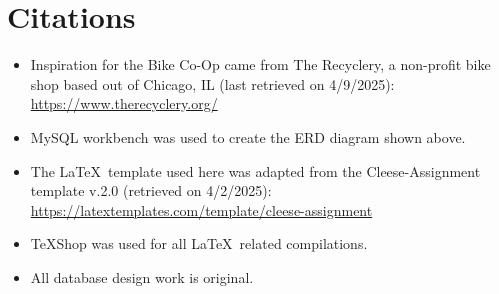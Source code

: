 \documentclass{article}
\begin{document}
\section{Citations}

\begin{tcolorbox}[colback=secondarycolor, colframe=primarycolor, arc=5mm]
\begin{itemize}
  \item Inspiration for the Bike Co-Op came from The Recyclery, a non-profit bike shop based out of Chicago, IL (last retrieved on 4/9/2025): \href{https://www.therecyclery.org/}{https://www.therecyclery.org/}
  
  \vspace{0.2cm}
  
  \item MySQL workbench was used to create the ERD diagram shown above.
  
  \vspace{0.2cm}
  
  \item The \LaTeX\ template used here was adapted from the Cleese-Assignment template v.2.0 (retrieved on 4/2/2025): \href{https://latextemplates.com/template/cleese-assignment}{https://latextemplates.com/template/cleese-assignment}
  
  \vspace{0.2cm}
  
  \item TeXShop was used for all \LaTeX\ related compilations.
  
  \vspace{0.2cm}
  
  \item All database design work is original.
\end{itemize}
\end{tcolorbox}
\end{document}
